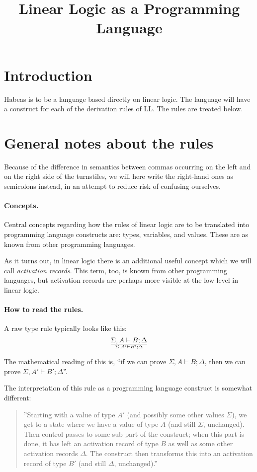 \documentclass[a4paper]{article}
\title{Linear Logic as a Programming Language}
\begin{document}
\maketitle

\section{Introduction}

Habeas is to be a language based directly on linear logic.
The language will have a construct for each of the derivation rules of LL.
The rules are treated below.

\section{General notes about the rules}

Because of the difference in semantics between commas occurring on the
left and on the right side of the turnstiles, we will here write the
right-hand ones as semicolons instead, in an attempt to reduce risk of
confusing ourselves.

\paragraph{Concepts.} Central concepts regarding how the rules of
linear logic are to be translated into programming language constructs
are: types, variables, and values. These are as known from other
programming languages.

As it turns out, in linear logic there is an additional useful concept
which we will call \emph{activation records}.  This term, too, is
known from other programming languages, but activation records are
perhaps more visible at the low level in linear logic.

\paragraph{How to read the rules.} A raw type rule typically looks like this:
$$
{\Sigma,A \vdash B;\Delta}\over{\Sigma,A' \vdash B';\Delta}
$$

The mathematical reading of this is, ``if we can prove ${\Sigma,A
  \vdash B;\Delta}$, then we can prove ${\Sigma,A' \vdash B';\Delta}$''.


The interpretation of this rule as a programming language construct is
somewhat different:
\begin{quote}
  ''Starting with a value of type $A'$ (and possibly some other values
  $\Sigma$), we get to a state where we have a value of type $A$ (and
  still $\Sigma$, unchanged). Then control passes to some sub-part of
  the construct; when this part is done, it has left an activation
  record of type $B$ as well as some other activation records
  $\Delta$. The construct then transforms this into an activation
  record of type $B'$ (and still $\Delta$, unchanged).''
\end{quote}
\end{document}
